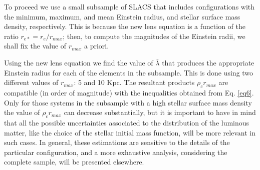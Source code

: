 \documentclass[10pt,a4paper]{article}
\begin{document}
\begin{multicols}{2}
To proceed we use a small subsample of SLACS that includes configurations with the minimum, maximum, and mean Einstein radius, and stellar surface mass density, respectively. This is because the new lens equation is a function of the ratio $r_{e\ast} = r_{e}/r_{max}$; then, to compute the magnitudes of the Einstein radii, we shall fix the value of $r_{max}$ a priori.\

Using the new lens equation we find the value of $\bar{\lambda}$ that produces the appropriate Einstein radius for each of the elements in the subsample. This is done using two different values of $r_{max}$: 5 and 10 Kpc. The resultant products $\rho_c r_{max}$ are compatible (in order of magnitude) with the inequalities obtained from Eq. \eqref{eq6}. Only for those systems in the subsample with a high stellar surface mass density the value of $\rho_c r_{max}$ can decrease substantially, but it is important to have in mind that all the possible
uncertainties associated to the distribution of the luminous matter, like the choice of the stellar initial mass function, will be more relevant in such cases. In general, these estimations are sensitive to the details of the particular configuration, and a more exhaustive analysis, considering the complete sample, will be presented elsewhere.
\end{multicols}
\end{document}

